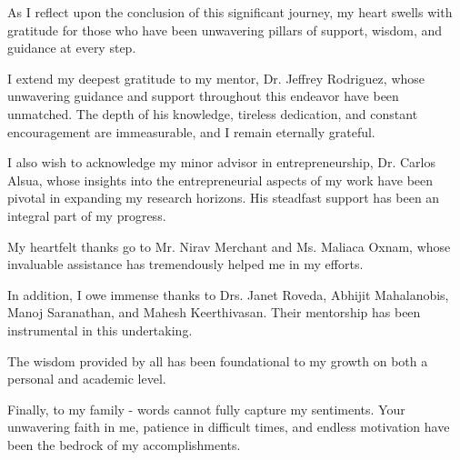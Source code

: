 As I reflect upon the conclusion of this significant journey, my heart swells with gratitude for those who have been unwavering pillars of support, wisdom, and guidance at every step.

I extend my deepest gratitude to my mentor, Dr\@. Jeffrey Rodriguez, whose unwavering guidance and support throughout this endeavor have been unmatched. The depth of his knowledge, tireless dedication, and constant encouragement are immeasurable, and I remain eternally grateful.

I also wish to acknowledge my minor advisor in entrepreneurship, Dr\@. Carlos Alsua, whose insights into the entrepreneurial aspects of my work have been pivotal in expanding my research horizons. His steadfast support has been an integral part of my progress.

My heartfelt thanks go to Mr\@. Nirav Merchant and Ms\@. Maliaca Oxnam, whose invaluable assistance has tremendously helped me in my efforts.

In addition, I owe immense thanks to Drs\@. Janet Roveda, Abhijit Mahalanobis, Manoj Saranathan, and Mahesh Keerthivasan. Their mentorship has been instrumental in this undertaking.

The wisdom provided by all has been foundational to my growth on both a personal and academic level.

Finally, to my family - words cannot fully capture my sentiments. Your unwavering faith in me, patience in difficult times, and endless motivation have been the bedrock of my accomplishments.

